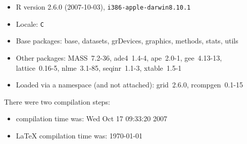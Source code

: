 \documentclass{article}
\begin{document}
\begin{itemize}
  \item R version 2.6.0 (2007-10-03), \verb|i386-apple-darwin8.10.1|
  \item Locale: \verb|C|
  \item Base packages: base, datasets, grDevices, graphics, methods,
    stats, utils
  \item Other packages: MASS~7.2-36, ade4~1.4-4, ape~2.0-1,
    gee~4.13-13, lattice~0.16-5, nlme~3.1-85, seqinr~1.1-3,
    xtable~1.5-1
  \item Loaded via a namespace (and not attached): grid~2.6.0,
    rcompgen~0.1-15
\end{itemize}
There were two compilation steps:

\begin{itemize}
  \item \Rlogo{} compilation time was: Wed Oct 17 09:33:20 2007
  \item \LaTeX{} compilation time was: \today
\end{itemize}


\clearpage
{}


\end{document}
